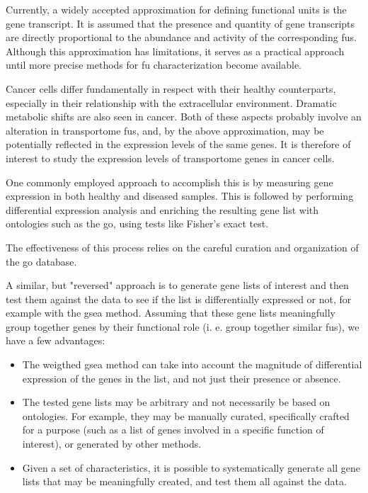 Currently, a widely accepted approximation for defining functional units is the gene transcript.
It is assumed that the presence and quantity of gene transcripts are directly proportional to the abundance and activity of the corresponding \glspl{fu}.
Although this approximation has limitations, it serves as a practical approach until more precise methods for \gls{fu} characterization become available.

Cancer cells differ fundamentally in respect with their healthy counterparts, especially in their relationship with the extracellular environment.
Dramatic metabolic shifts are also seen in cancer.
Both of these aspects probably involve an alteration in transportome \glspl{fu}, and, by the above approximation, may be potentially reflected in the expression levels of the same genes.
It is therefore of interest to study the expression levels of transportome genes in cancer cells.

One commonly employed approach to accomplish this is by measuring gene expression in both healthy and diseased samples.
This is followed by performing differential expression analysis and enriching the resulting gene list with ontologies such as the \gls{go}, using tests like Fisher's exact test.

The effectiveness of this process relies on the careful curation and organization of the \gls{go} database.

A similar, but "reversed" approach is to generate gene lists of interest and then test them against the data to see if the list is differentially expressed or not, for example with the \gls{gsea} method.
Assuming that these gene lists meaningfully group together genes by their functional role (i. e. group together similar \glspl{fu}), we have a few advantages:
\begin{itemize}
    \item The weigthed \gls{gsea} method can take into account the magnitude of differential expression of the genes in the list, and not just their presence or absence.
    \item The tested gene lists may be arbitrary and not necessarily be based on ontologies. For example, they may be manually curated, specifically crafted for a purpose (such as a list of genes involved in a specific function of interest), or generated by other methods.
    \item Given a set of characteristics, it is possible to systematically generate all gene lists that may be meaningfully created, and test them all against the data.
\end{itemize}

